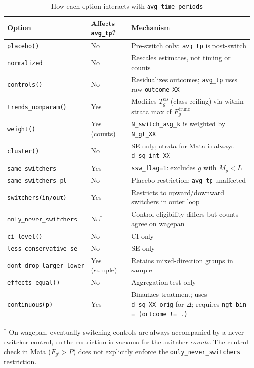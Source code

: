 \documentclass[11pt]{article}
\begin{document}
\begin{table}[ht]
\centering
\caption{How each option interacts with \texttt{avg\_time\_periods}}
\label{tab:interactions}
\renewcommand{\arraystretch}{1.25}
\begin{tabular}{@{}lp{2.8cm}p{8cm}@{}}
\toprule
Option & Affects \texttt{avg\_tp}? & Mechanism \\
\midrule
\texttt{placebo()} & No & Pre-switch only; \texttt{avg\_tp} is post-switch \\
\texttt{normalized} & No & Rescales estimates, not timing or counts \\
\texttt{controls()} & No & Residualizes outcomes; \texttt{avg\_tp} uses raw \texttt{outcome\_XX} \\
\texttt{trends\_nonparam()} & Yes & Modifies $T_g^{\text{cls}}$ (class ceiling) via within-strata max of $F_g^{\text{trunc}}$ \\
\texttt{weight()} & Yes (counts) & \texttt{N\_switch\_avg\_k} is weighted by \texttt{N\_gt\_XX} \\
\texttt{cluster()} & No & SE only; strata for Mata is always \texttt{d\_sq\_int\_XX} \\
\texttt{same\_switchers} & Yes & \texttt{ssw\_flag=1}: excludes $g$ with $M_g < L$ \\
\texttt{same\_switchers\_pl} & No & Placebo restriction; \texttt{avg\_tp} unaffected \\
\texttt{switchers(in/out)} & Yes & Restricts to upward/downward switchers in outer loop \\
\texttt{only\_never\_switchers} & No$^*$ & Control eligibility differs but counts agree on wagepan \\
\texttt{ci\_level()} & No & CI only \\
\texttt{less\_conservative\_se} & No & SE only \\
\texttt{dont\_drop\_larger\_lower} & Yes (sample) & Retains mixed-direction groups in sample \\
\texttt{effects\_equal()} & No & Aggregation test only \\
\texttt{continuous(p)} & Yes & Binarizes treatment; uses \texttt{d\_sq\_XX\_orig} for $\Delta$; requires \texttt{ngt\_bin = (outcome != .)} \\
\bottomrule
\end{tabular}
\vspace{4pt}

{\footnotesize $^*$ On wagepan, eventually-switching controls are always
accompanied by a never-switcher control, so the restriction is vacuous for
the switcher \emph{counts}. The control check in Mata ($F_{g'} > P$) does not
explicitly enforce the \texttt{only\_never\_switchers} restriction.}
\end{table}
\end{document}
